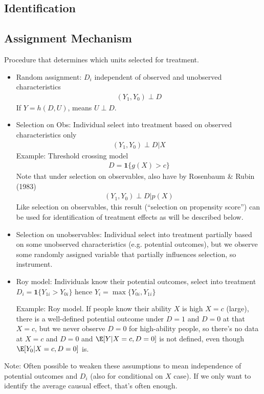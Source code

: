 \documentclass[12pt]{article}
\theoremstyle{plain}
\theoremstyle{definition}
\theoremstyle{remark}
\begin{document}
\clearpage
\subsection{Identification}



\clearpage
\subsection{Assignment Mechanism}

Procedure that determines which units selected for treatment.
\begin{itemize}
  \item Random assignment: $D_i$ independent of observed and
    unobserved characteristics
    \begin{align*}
      (Y_1,Y_0)\perp D
    \end{align*}
    If $Y=h(D,U)$, means $U\perp D$.

  \item Selection on Obs:
    Individual select into treatment based on observed
    characteristics only
    \begin{align*}
      (Y_1,Y_0)\perp D | X
    \end{align*}
    Example:
    Threshold crossing model
    \begin{align*}
      D = \mathbf{1}\{g(X)>c\}
    \end{align*}
    Note that under selection on observables, also have by
    Rosenbaum \& Rubin (1983)
    \begin{align*}
      (Y_1,Y_0)\perp D |p(X)
    \end{align*}
    Like selection on observables, this result (``selection on
    propensity score'') can be used for identification of treatment
    effects as will be described below.


  \item Selection on unobservables:
    Individual select into treatment partially based on some
    unobserved characteristics (e.g. potential outcomes), but we
    observe some randomly assigned variable that partially
    influences selection, so instrument.

  \item
    Roy model:
    Individuals know their potential outcomes,
    select into treatment $D_i=\mathbf{1}\{Y_{1i}>Y_{0i}\}$
    hence $Y_i=\max\{Y_{0i},Y_{1i}\}$

Example: Roy model. If people know their ability $X$ is high $X=c$
(large), there is a well-defined potential outcome under $D=1$ and
$D=0$ at that $X=c$, but we never observe $D=0$ for high-ability
people, so there's no data at $X=c$ and $D=0$ and $\E[Y|X=c,D=0]$ is
not defined, even though $\E[Y_0|X=c,D=0]$ is.

\end{itemize}
Note:
Often possible to weaken these assumptions to mean independence of
potential outcomes and $D_i$ (also for conditional on $X$ case).
If we only want to identify the average causual effect, that's often
enough.
\end{document}
